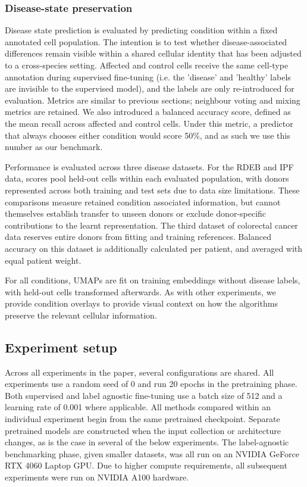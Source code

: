 \documentclass{article}
\begin{document}
\subsubsection{Disease-state preservation}
Disease state prediction is evaluated by predicting condition within a fixed annotated cell population. The intention is to test whether disease-associated differences remain visible within a shared cellular identity that has been adjusted to a cross-species setting. 
Affected and control cells receive the same cell-type annotation during supervised fine-tuning (i.e. the 'disease' and 'healthy' labels are invisible to the supervised model), and the labels are only re-introduced for evaluation. Metrics are similar to previous sections; neighbour voting and mixing metrics are retained. We also introduced a balanced accuracy score, defined as the mean recall across affected and control cells. Under this metric, a predictor that always chooses either condition would score 50\%, and as such we use this number as our benchmark.

Performance is evaluated across three disease datasets. For the RDEB \cite{RDEB2023} and IPF \cite{AdamsIPF2020} data, scores pool held-out cells within each evaluated population, with donors represented across both training and test sets due to data size limitations. These comparisons measure retained condition associated information, but cannot themselves establish transfer to unseen donors or exclude donor-specific contributions to the learnt representation. The third dataset of colorectal cancer data \cite{PelkaCRC2021} reserves entire donors from fitting and training references. Balanced accuracy on this dataset is additionally calculated per patient, and averaged with equal patient weight.

For all conditions, UMAPs are fit on training embeddings without disease labels, with held-out cells transformed afterwards. As with other experiments, we provide condition overlays to provide visual context on how the algorithms preserve the relevant cellular information.
\subsection{Experiment setup}
Across all experiments in the paper, several configurations are shared. All experiments use a random seed of 0 and run 20 epochs in the pretraining phase. Both supervised and label agnostic fine-tuning use a batch size of 512 and a learning rate of 0.001 where applicable. All methods compared within an individual experiment begin from the same pretrained checkpoint. Separate pretrained models are constructed when the input collection or architecture changes, as is the case in several of the below experiments. The label-agnostic benchmarking phase, given smaller datasets, was all run on an NVIDIA GeForce RTX 4060 Laptop GPU. Due to higher compute requirements, all subsequent experiments were run on NVIDIA A100 hardware.
\end{document}
